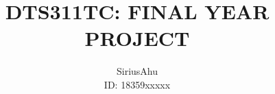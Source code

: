\renewcommand{\TemplateModuleCode}{DTS311TC}
\renewcommand{\TemplateModuleName}{FINAL YEAR PROJECT}
\renewcommand{\TemplateAuthorName}{SiriusAhu}
\renewcommand{\TemplateSupervisorName}{Supervisor Name}
\renewcommand{\TemplateAuthorID}{18359xxxxx}

\title{%
  \TemplateModuleCode: \TemplateModuleName
}
\author{
    \TemplateAuthorName\\
    ID: \TemplateAuthorID
    }



